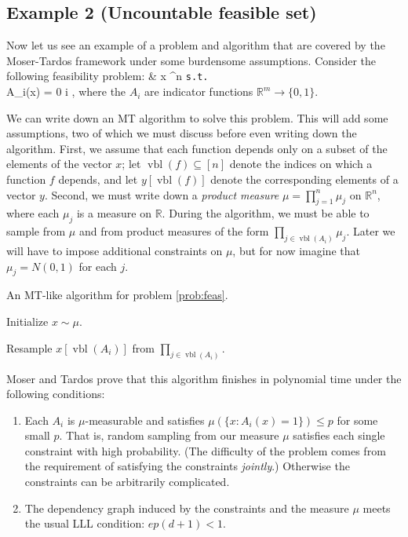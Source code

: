 \documentclass[twocolumn]{article}
\def\seqn#1\eeqn{\begin{align}#1\end{align}}
\newcommand{\hasDist}%
  {\sim}
\newcommand{\Reals}%
  {\mathbb{R}}
\begin{document}
\subsection{Example 2 (Uncountable feasible set)}
\label{subsec:uncountable}
Now let us see an example of a problem and algorithm that are covered by the Moser-Tardos framework under some burdensome assumptions.  Consider the following feasibility problem:
\seqn
  \label{prob:feas}
   & x \in \Reals^n \texttt{s.t.} \\
  A_i(x) = 0 \forall i \in [m] ,
\eeqn
where the $A_i$ are indicator functions $\Reals^{m} \to \{0,1\}$.

We can write down an MT algorithm to solve this problem.  This will add some assumptions, two of which we must discuss before even writing down the algorithm.  First, we assume that each function depends only on a subset of the elements of the vector $x$; let $\operatorname{vbl}(f) \subseteq [n]$ denote the indices on which a function $f$ depends, and let $y[\operatorname{vbl}(f)]$ denote the corresponding elements of a vector $y$.  Second, we must write down a \emph{product measure} $\mu = \prod_{j=1}^{n} \mu_j$ on $\Reals^n$, where each $\mu_j$ is a measure on $\Reals$.  During the algorithm, we must be able to sample from $\mu$ and from product measures of the form $\prod_{j \in \operatorname{vbl}(A_i)} \mu_j$.  Later we will have to impose additional constraints on $\mu$, but for now imagine that $\mu_j = N(0, 1)$ for each $j$.

\begin{algorithm}[H]
\caption{An MT-like algorithm for problem \ref{prob:feas}.}
\label{alg:mt-feas}
\begin{algorithmic}[1]

\State Initialize $x \hasDist \mu$.
\EndFor

    \Return
  \EndIf
  \State Resample $x[\operatorname{vbl}(A_i)]$ from $\prod_{j \in \operatorname{vbl}(A_i)}$.
  \EndFor
\EndFunction

\end{algorithmic}
\end{algorithm}

Moser and Tardos prove that this algorithm finishes in polynomial time under the following conditions:

\begin{enumerate}
  \item Each $A_i$ is $\mu$-measurable and satisfies $\mu(\{x: A_i(x) = 1\}) \leq p$ for some small $p$.  That is, random sampling from our measure $\mu$ satisfies each single constraint with high probability.  (The difficulty of the problem comes from the requirement of satisfying the constraints \emph{jointly}.)  Otherwise the constraints can be arbitrarily complicated.  \label{eqn:feas-margprob-condition}
  \item The dependency graph induced by the constraints and the measure $\mu$ meets the usual LLL condition: $e p (d+1) < 1$. \label{eqn:feas-lowdep-condition}
\end{enumerate}
\end{document}
